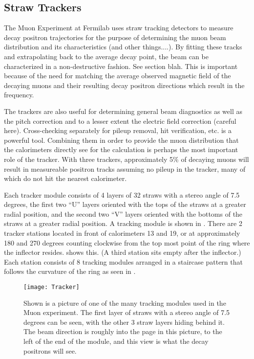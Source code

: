 \subsection{Straw Trackers}
\label{sec:StrawTrackers}

The Muon \gmtwo Experiment at Fermilab uses straw tracking detectors to measure decay positron trajectories for the purpose of determining the muon beam distribution and its characteristics (and other things....). By fitting these tracks and extrapolating back to the average decay point, the beam can be characterized in a non-destructive fashion. See section blah. This is important because of the need for matching the average observed magnetic field of the decaying muons and their resulting decay positron directions which result in the \wa frequency.

The trackers are also useful for determining general beam diagnostics as well as the pitch correction and to a lesser extent the electric field correction (careful here). Cross-checking separately for pileup removal, hit verification, etc. is a powerful tool. Combining them in order to provide the muon distribution that the calorimeters directly see for the \wa calculation is perhaps the most important role of the tracker. With three trackers, approximately 5\% of decaying muons will result in measureable positron tracks assuming no pileup in the tracker, many of which do not hit the nearest calorimeter.

Each tracker module consists of 4 layers of 32 straws with a stereo angle of 7.5 degrees, the first two ``U'' layers oriented with the tops of the straws at a greater radial position, and the second two ``V'' layers oriented with the bottoms of the straws at a greater radial position. A tracking module is shown in . There are 2 tracker stations located in front of calorimeters 13 and 19, or at approximately 180 and 270 degrees counting clockwise from the top most point of the ring where the inflector resides.  shows this. (A third station sits empty after the inflector.) Each station consists of 8 tracking modules arranged in a staircase pattern that follows the curvature of the ring as seen in .

\begin{figure}[]
    \centering
    \texttt{[image: Tracker]}
    \caption[Tracker module]{Shown is a picture of one of the many tracking modules used in the Muon \gmtwo experiment. The first layer of straws with a stereo angle of 7.5 degrees can be seen, with the other 3 straw layers hiding behind it. The beam direction is roughly into the page in this picture, to the left of the end of the module, and this view is what the decay positrons will see.}
    \label{fig:tracker}
\end{figure}


